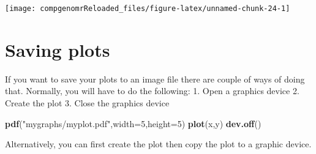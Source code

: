 \documentclass[12pt,]{krantz}
\newenvironment{Shaded}{\begin{snugshade}}{\end{snugshade}}
\newcommand{\DataTypeTok}[1]{\textcolor[rgb]{0.13,0.29,0.53}{#1}}
\newcommand{\DecValTok}[1]{\textcolor[rgb]{0.00,0.00,0.81}{#1}}
\newcommand{\KeywordTok}[1]{\textcolor[rgb]{0.13,0.29,0.53}{\textbf{#1}}}
\newcommand{\NormalTok}[1]{#1}
\newcommand{\StringTok}[1]{\textcolor[rgb]{0.31,0.60,0.02}{#1}}
\begin{document}
\begin{Shaded}
\end{Shaded}

\begin{center}\texttt{[image: compgenomrReloaded\_files/figure-latex/unnamed-chunk-24-1]} \end{center}

\hypertarget{saving-plots}{%
\section{Saving plots}\label{saving-plots}}

If you want to save your plots to an image file there are couple of ways of doing that. Normally, you will have to do the following:
1. Open a graphics device
2. Create the plot
3. Close the graphics device

\begin{Shaded}
\begin{Highlighting}[]
\KeywordTok{pdf}\NormalTok{(}\StringTok{"mygraphs/myplot.pdf"}\NormalTok{,}\DataTypeTok{width=}\DecValTok{5}\NormalTok{,}\DataTypeTok{height=}\DecValTok{5}\NormalTok{)}
\KeywordTok{plot}\NormalTok{(x,y)}
\KeywordTok{dev.off}\NormalTok{()}
\end{Highlighting}
\end{Shaded}

Alternatively, you can first create the plot then copy the plot to a graphic device.
\end{document}
